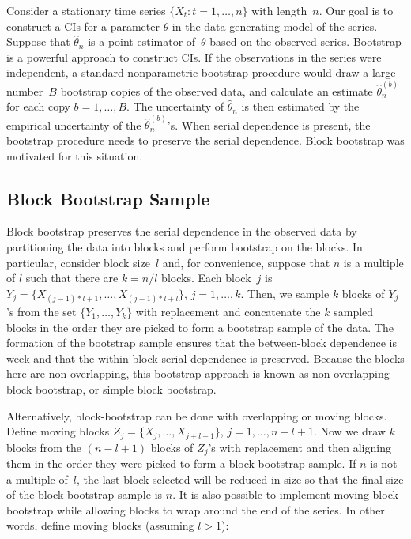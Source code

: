 \documentclass[12pt, letterpaper, titlepage]{article}
\begin{document}
Consider a stationary time series $\{X_t: t = 1, \ldots, n\}$ with length~$n$.
Our goal is to construct a CIs for a parameter $\theta$ in the
data generating model of the series. Suppose that $\hat\theta_n$ is a point
estimator of~$\theta$ based on the observed series. Bootstrap is a powerful
approach to construct CIs. If the observations in the series
were independent, a standard nonparametric bootstrap procedure would draw a
large number~$B$ bootstrap copies of the observed data, and calculate an
estimate $\hat\theta_n^{(b)}$ for each copy $b = 1, \ldots, B$. The uncertainty
of $\hat\theta_n$ is then estimated by the empirical uncertainty of the
$\hat\theta_n^{(b)}$'s. When serial dependence is present, the bootstrap
procedure needs to preserve the serial dependence. Block bootstrap was
motivated for this situation. 


\subsection{Block Bootstrap Sample}

Block bootstrap preserves the serial dependence in the observed data by
partitioning the data into blocks and perform bootstrap on the blocks.
In particular, consider block size~$l$ and, for convenience, suppose that
$n$ is a multiple of $l$ such that there are $k = n / l$ blocks. Each block~$j$
is $Y_j = \{X_{(j - 1) * l + 1}, \ldots, X_{(j - 1) * l + l}\}$,
$j = 1, \ldots,   k$.  Then, we sample $k$ blocks of $Y_j$'s from the set 
$\{Y_1, \ldots, Y_k\}$ with replacement and concatenate the $k$ sampled blocks
in the order they are picked to form a bootstrap sample of the data. The
formation of the bootstrap sample ensures that the between-block dependence is
week and that the within-block serial dependence is preserved. Because the
blocks here are non-overlapping, this bootstrap approach is known as
non-overlapping block bootstrap, or simple block bootstrap.


Alternatively, block-bootstrap can be done with overlapping or moving blocks.
Define moving blocks $Z_j = \{X_j, \ldots, X_{j + l - 1}\}$,
$j = 1, \ldots, n - l + 1$. Now we draw $k$ blocks from the $(n - l + 1)$
blocks
of $Z_j$'s with replacement and then aligning them in the order they were
picked
to form a block bootstrap sample. If $n$ is not a multiple of~$l$, the last
block selected will be reduced in size so that the final size of the
block bootstrap sample is $n$. It is also possible to implement moving block
bootstrap while allowing blocks to wrap around the end of the series. In other
words, define moving blocks (assuming $l > 1$):
\end{document}
